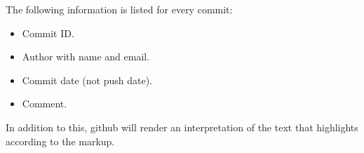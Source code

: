 The following information is listed for every commit:
\begin{itemize}
  \item Commit ID.
  \item Author with name and email.
  \item Commit date (not push date).
  \item Comment.
\end{itemize}

In addition to this, github will render an interpretation of the text that highlights according to the markup.
